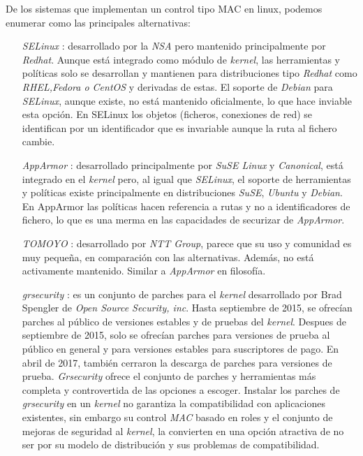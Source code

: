 De los sistemas que implementan un control tipo MAC en linux, podemos enumerar como las principales alternativas:

\begin{itemize}
    \item[\emph{SELinux}]: desarrollado por la \emph{NSA} pero mantenido principalmente por \emph{Redhat}. Aunque está integrado como módulo de \emph{kernel},
    las herramientas y políticas solo se desarrollan y mantienen para distribuciones tipo \emph{Redhat} como \emph{RHEL,Fedora o CentOS} y derivadas de estas.
    El soporte de \emph{Debian} para \emph{SELinux}, aunque existe, no está mantenido oficialmente, lo que hace inviable esta opción. En SELinux los objetos (ficheros, conexiones de red) se identifican por
    un identificador que es invariable aunque la ruta al fichero cambie. 
    \item[\emph{AppArmor}]: desarrollado principalmente por \emph{SuSE Linux} y \emph{Canonical}, está integrado en el \emph{kernel} pero, al igual que \emph{SELinux}, 
    el soporte de herramientas y políticas existe principalmente en distribuciones \emph{SuSE}, \emph{Ubuntu} y \emph{Debian}. En AppArmor las políticas hacen referencia a rutas y no 
    a identificadores de fichero, lo que es una merma en las capacidades de securizar de \emph{AppArmor}.
    \item[\emph{TOMOYO}]: desarrollado por \emph{NTT Group}, parece que su uso y comunidad es muy pequeña, en comparación con las alternativas. Además, no está activamente mantenido. Similar a \emph{AppArmor} en filosofía.
    \item[\emph{grsecurity}]: es un conjunto de parches para el \emph{kernel} desarrollado por Brad Spengler de \emph{Open Source Security, inc}. Hasta septiembre de 2015, se ofrecían parches al público de versiones estables y de pruebas del \emph{kernel}. 
    Despues de septiembre de 2015, solo se ofrecían parches para versiones de prueba al público en general y para versiones estables para suscriptores de pago. En abril de 2017, también cerraron la descarga de parches
    para versiones de prueba. \emph{Grsecurity} ofrece el conjunto de parches y herramientas más completa y controvertida de las opciones a escoger. Instalar los parches de \emph{grsecurity} en un \emph{kernel}
    no garantiza la compatibilidad con aplicaciones existentes, sin embargo su control \emph{MAC} basado en roles y el conjunto de mejoras de seguridad al \emph{kernel}, la convierten en una opción atractiva de no ser por su modelo de distribución y sus problemas de compatibilidad.
\end{itemize}

